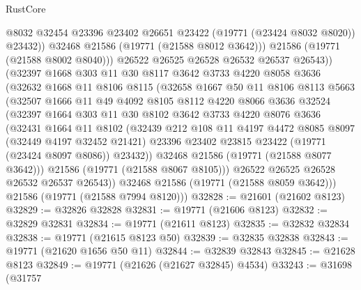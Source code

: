 \begin{lexlean}{RustCore}
\begin{coremodule}
                  @8032
                  @32454
                  @23396
                  @23402
                  @26651
                  @23422
                  (@19771 (@23424 @8032 @8020))
                  @23432))
              @32468
              @21586
              (@19771 (@21588 @8012 @3642)))
            @21586
            (@19771 (@21588 @8002 @8040)))
          @26522
          @26525
          @26528
          @26532
          @26537
          @26543))
      (@32397
        @1668
        @303
        @11
        @30
        @8117
        @3642
        @3733
        @4220
        @8058
        @3636
        (@32632
          @1668
          @11
          @8106
          @8115
          (@32658
            @1667
            @50
            @11
            @8106
            @8113
            @5663
            (@32507
              @1666
              @11
              @49
              @4092
              @8105
              @8112
              @4220
              @8066
              @3636
              @32524
              (@32397
                @1664
                @303
                @11
                @30
                @8102
                @3642
                @3733
                @4220
                @8076
                @3636
                (@32431
                  @1664
                  @11
                  @8102
                  (@32439
                    @212
                    @108
                    @11
                    @4197
                    @4472
                    @8085
                    @8097
                    (@32449 @4197 @32452 @21421)
                    @23396
                    @23402
                    @23815
                    @23422
                    (@19771 (@23424 @8097 @8086))
                    @23432))
                @32468
                @21586
                (@19771 (@21588 @8077 @3642)))
              @21586
              (@19771 (@21588 @8067 @8105)))
            @26522
            @26525
            @26528
            @26532
            @26537
            @26543))
        @32468
        @21586
        (@19771 (@21588 @8059 @3642)))
      @21586
      (@19771 (@21588 @7994 @8120)))
@32828 := @21601 (@21602 @8123)
@32829 := @32826 @32828
@32831 := @19771 (@21606 @8123)
@32832 := @32829 @32831
@32834 := @19771 (@21611 @8123)
@32835 := @32832 @32834
@32838 := @19771 (@21615 @8123 @50)
@32839 := @32835 @32838
@32843 := @19771 (@21620 @1656 @50 @11)
@32844 := @32839 @32843
@32845 := @21628 @8123
@32849 := @19771 (@21626 (@21627 @32845) @4534)
@33243 := @31698
    (@31757

\end{coremodule}
\end{lexlean}
